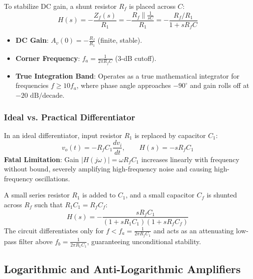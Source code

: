 \documentclass[12pt,a4paper]{article}
\begin{document}
\begin{tcolorbox}[formulabox, title={Practical / Lossy Integrator Formulation}]
To stabilize DC gain, a shunt resistor $R_f$ is placed across $C$:
\begin{equation}
  H(s) = -\frac{Z_f(s)}{R_1} = -\frac{R_f \parallel \frac{1}{sC}}{R_1} = -\frac{R_f / R_1}{1 + s R_f C}
\end{equation}
\begin{itemize}[leftmargin=12pt, itemsep=2pt, topsep=1pt]
  \item \textbf{DC Gain}: $A_v(0) = -\frac{R_f}{R_1}$ (finite, stable).
  \item \textbf{Corner Frequency}: $f_a = \frac{1}{2\pi R_f C}$ (3-dB cutoff).
  \item \textbf{True Integration Band}: Operates as a true mathematical integrator for frequencies $f \ge 10 f_a$, where phase angle approaches $-90^\circ$ and gain rolls off at $-20\text{ dB/decade}$.
\end{itemize}
\end{tcolorbox}

\subsubsection{Ideal vs. Practical Differentiator}
In an ideal differentiator, input resistor $R_1$ is replaced by capacitor $C_1$:
\begin{equation}
  v_o(t) = -R_f C_1 \frac{dv_i}{dt}, \qquad H(s) = -s R_f C_1
\end{equation}
\textbf{Fatal Limitation}: Gain $|H(j\omega)| = \omega R_f C_1$ increases linearly with frequency without bound, severely amplifying high-frequency noise and causing high-frequency oscillations.
\begin{tcolorbox}[formulabox, title={Practical Differentiator}]
A small series resistor $R_1$ is added to $C_1$, and a small capacitor $C_f$ is shunted across $R_f$ such that $R_1 C_1 = R_f C_f$:
\begin{equation}
  H(s) = -\frac{s R_f C_1}{(1 + s R_1 C_1)(1 + s R_f C_f)}
\end{equation}
The circuit differentiates only for $f < f_a = \frac{1}{2\pi R_f C_1}$ and acts as an attenuating low-pass filter above $f_b = \frac{1}{2\pi R_1 C_1}$, guaranteeing unconditional stability.
\end{tcolorbox}

\subsection{Logarithmic and Anti-Logarithmic Amplifiers}
\end{document}
